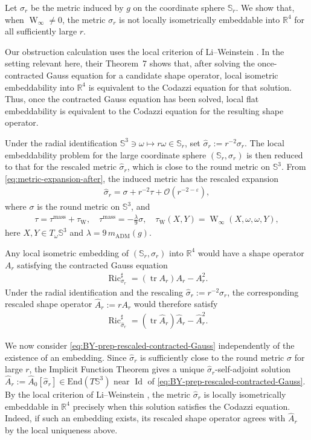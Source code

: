 \documentclass[10pt,a4paper]{amsart}
\newcommand{\R}{\mathbb{R}}
\newcommand{\Sph}{\mathbb{S}}
\newcommand{\tr}{\operatorname{tr}}
\newcommand{\Ric}{\operatorname{Ric}}
\newcommand{\Weyl}{\operatorname{W}}
\newcommand{\Id}{\operatorname{Id}}
\newcommand{\End}{\mathrm{End}}
\newcommand{\ADM}{\mathrm{ADM}}
\newcommand{\mass}{\mathrm{mass}}
\begin{document}
	Let $\sigma_r$ be the metric induced by $g$ on the coordinate sphere
	$\Sph_r$.  We show that, when $\Weyl_\infty\neq0$, the metric $\sigma_r$ is not
	locally isometrically embeddable into $\R^4$ for all sufficiently large $r$.
	
	Our obstruction calculation uses the local criterion of Li--Weinstein
	\cite{LiWeinstein}.  In the setting relevant here, their Theorem~7 shows
	that, after solving the once-contracted Gauss equation for a candidate shape
	operator, local isometric embeddability into $\R^4$ is equivalent to the
	Codazzi equation for that solution. Thus, once the contracted Gauss equation has been solved, local flat
	embeddability is equivalent to the Codazzi equation for the resulting shape
	operator.
	
	Under the radial identification
	$\Sph^3\ni\omega\mapsto r\omega\in\Sph_r$, set
	$\hat\sigma_r:=r^{-2}\sigma_r$.  The local embeddability problem for the
	large coordinate sphere $(\Sph_r,\sigma_r)$ is then reduced to that for the
	rescaled metric $\hat\sigma_r$, which is close to the round metric on
	$\Sph^3$. From \eqref{eq:metric-expansion-after}, the induced metric has the rescaled expansion
	\begin{align}
		\hat\sigma_r
		=
		\sigma+r^{-2}\tau+\mathcal O(r^{-2-\varepsilon}),
	\end{align}
	where $\sigma$ is the round metric on $\Sph^3$, and
	\begin{align}
		\tau
		=
		\tau^{\mass}+\tau_{\Weyl},
		\quad
		\tau^{\mass}
		=
		-\frac{\lambda}{9}\sigma,
		\quad
		\tau_{\Weyl}(X,Y)
		=
		\Weyl_\infty(X,\omega,\omega,Y),
	\end{align}
	here $X,Y\in T_\omega\Sph^3$ and
	$\lambda=9\,m_{\ADM}(g)$.
	
	Any local isometric embedding of $(\Sph_r,\sigma_r)$ into $\R^4$ would
	have a shape operator $A_r$ satisfying the contracted Gauss equation
	\begin{align*}
		\Ric_{\sigma_r}^{\sharp}
		=
		(\tr A_r)A_r-A_r^2.
	\end{align*}
	Under the radial identification and the rescaling
	$\hat\sigma_r:=r^{-2}\sigma_r$, the corresponding rescaled shape operator
	$\hat A_r:=rA_r$ would therefore satisfy
	\begin{align}\label{eq:BY-prep-rescaled-contracted-Gauss}
		\Ric_{\hat\sigma_r}^{\sharp}
		=
		(\tr \hat A_r)\hat A_r-\hat A_r^2.
	\end{align}
	
	We now consider \eqref{eq:BY-prep-rescaled-contracted-Gauss} independently
	of the existence of an embedding.  Since $\hat\sigma_r$ is sufficiently close
	to the round metric $\sigma$ for large $r$, the Implicit Function Theorem
	gives a unique $\hat\sigma_r$-self-adjoint solution $\hat A_r:=\hat A_0[\hat\sigma_r]\in\End(T\Sph^3)$ near $\Id$ of \eqref{eq:BY-prep-rescaled-contracted-Gauss}.  By the local
	criterion of Li--Weinstein \cite{LiWeinstein}, the metric $\hat\sigma_r$ is
	locally isometrically embeddable in $\R^4$ precisely when this solution
	satisfies the Codazzi equation.  Indeed, if such an embedding exists, its
	rescaled shape operator agrees with $\hat A_r$ by the local uniqueness above.
	
\end{document}

